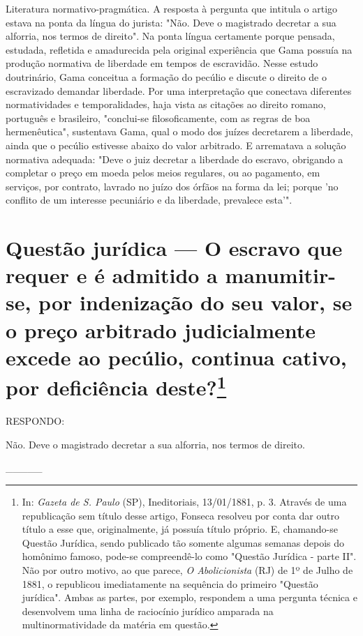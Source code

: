 {\small\noindent
Literatura normativo-pragmática. A resposta à pergunta que
intitula o artigo estava na ponta da língua do jurista: "Não. Deve o
magistrado decretar a sua alforria, nos termos de direito". Na ponta
língua certamente porque pensada, estudada, refletida e amadurecida pela
original experiência que Gama possuía na produção normativa de liberdade
em tempos de escravidão. Nesse estudo doutrinário, Gama conceitua a
formação do pecúlio e discute o direito de o escravizado demandar
liberdade. Por uma interpretação que conectava diferentes normatividades
e temporalidades, haja vista as citações ao direito romano, português e
brasileiro, "conclui-se filosoficamente, com as regras de boa
hermenêutica", sustentava Gama, qual o modo dos juízes decretarem a
liberdade, ainda que o pecúlio estivesse abaixo do valor arbitrado. E
arrematava a solução normativa adequada: "Deve o juiz decretar a
liberdade do escravo, obrigando a completar o preço em moeda pelos meios
regulares, ou ao pagamento, em serviços, por contrato, lavrado no juízo
dos órfãos na forma da lei; porque 'no conflito de um interesse
pecuniário e da liberdade, prevalece esta'". }

\chapter{Questão jurídica --- O escravo que requer e é admitido a
manumitir-se, por indenização do seu valor, se o preço arbitrado
judicialmente excede ao pecúlio, continua cativo, por deficiência
deste?\footnote[*]{In: \emph{Gazeta de S. Paulo} (SP), Ineditoriais,
  13/01/1881, p. 3. Através de uma republicação sem título desse artigo,
  Fonseca resolveu por conta dar outro título a esse que, originalmente,
  já possuía título próprio. E, chamando-se Questão Jurídica, sendo
  publicado tão somente algumas semanas depois do homônimo famoso,
  pode-se compreendê-lo como "Questão Jurídica - parte II". Não por
  outro motivo, ao que parece, \emph{O Abolicionista} (RJ) de 1º de
  Julho de 1881, o republicou imediatamente na sequência do primeiro
  "Questão jurídica". Ambas as partes, por exemplo, respondem a uma
  pergunta técnica e desenvolvem uma linha de raciocínio jurídico
  amparada na multinormatividade da matéria em questão.}}


RESPONDO:

Não. Deve o magistrado decretar a sua alforria, nos termos de direito.

\_\_\_\_\_


